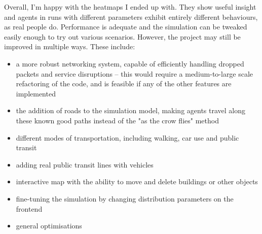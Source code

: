 Overall, I'm happy with the heatmaps I ended up with. They show useful insight and agents in runs with different parameters exhibit entirely different behaviours, as real people do. Performance is adequate and the simulation can be tweaked easily enough to try out various scenarios. However, the project may still be improved in multiple ways. These include:
\begin{itemize}
    \item a more robust networking system, capable of efficiently handling dropped packets and service disruptions -- this would require a medium-to-large scale refactoring of the code, and is feasible if any of the other features are implemented
    \item the addition of roads to the simulation model, making agents travel along these known good paths instead of the "as the crow flies" method
    \item different modes of transportation, including walking, car use and public transit
    \item adding real public transit lines with vehicles 
    \item interactive map with the ability to move and delete buildings or other objects
    \item fine-tuning the simulation by changing distribution parameters on the frontend
    \item general optimisations
\end{itemize}